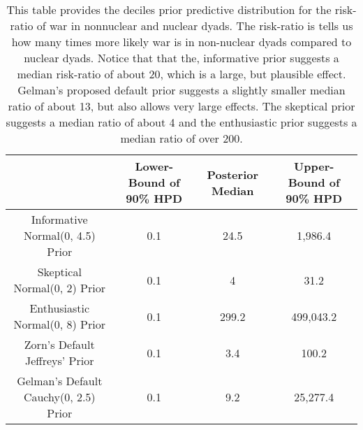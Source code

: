 \begin{table}[H]
\centering
{\scriptsize
\begin{tabular}{|cccc|}
  \hline
 & Lower-Bound of 90\% HPD & Posterior Median & Upper-Bound of 90\% HPD \\ 
  \hline
Informative Normal(0, 4.5) Prior &       0.1 &      24.5 &   1,986.4 \\ 
  Skeptical Normal(0, 2) Prior &       0.1 &         4 &      31.2 \\ 
  Enthusiastic Normal(0, 8) Prior &       0.1 &     299.2 & 499,043.2 \\ 
  Zorn's Default Jeffreys' Prior &       0.1 &       3.4 &     100.2 \\ 
  Gelman's Default Cauchy(0, 2.5) Prior &       0.1 &       9.2 &  25,277.4 \\ 
   \hline
\end{tabular}
}
\caption{This table provides the deciles prior predictive distribution for the
risk-ratio of war in nonnuclear and nuclear dyads. The risk-ratio is
tells us how many times more likely war is in non-nuclear dyads compared
to nuclear dyads. Notice that that the, informative prior suggests a median
risk-ratio of about 20, which is a large, but plausible effect. Gelman's
proposed default prior suggests a slightly smaller median ratio of about 13,
but also allows very large effects. The skeptical prior suggests a median
ratio of about 4 and the enthusiastic prior suggests a median ratio of over
200.} 
\label{tab:bm-pppd-deciles}
\end{table}
